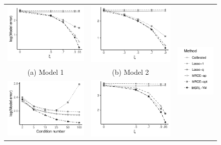 \documentclass[12pt]{article}
\begin{document}
\begin{figure}[h!]
\begin{tabular}{ccc}
\includegraphics[width=6.5cm]{Plots/NormalHet_AR1_ModelErr_April.pdf} &   \includegraphics[width=6.5cm]{Plots/NormalHet_Const_ModelErr_April.pdf} & \multirow{4}{*}{\includegraphics[width=3.5cm]{Plots/Vert_Legend.pdf}} \\
(a) Model 1  & (b) Model 2  & \\[6pt]
 \includegraphics[width=6.5cm]{Plots/NormalHet_Dense_ModelErr_April.pdf} &   \includegraphics[width=6.8cm]{Plots/THet_AR1_ModelErr_April.pdf} &  \\

\end{tabular}
\end{figure}
\end{document}
